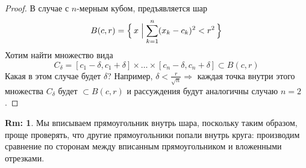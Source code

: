 \documentclass[12pt]{article}
\theoremstyle{definition}
\newtheorem{rem}{Rm:}
\begin{document}
\begin{proof}
	В случае с $n$-мерным кубом, предъявляется шар 
	$$
		B(c,r) = \Big\{\, x \Bigm\vert \sum\limits_{k = 1}^n (x_k - c_k)^2 < r^2 \,\Big\}
	$$ 
	Хотим найти множество вида 
	$$
		C_\delta = [c_1 - \delta, c_1 + \delta]\times \dotsc \times [c_n - \delta, c_n + \delta] \subset B(c,r)
	$$ 
	Какая в этом случае будет $\delta$? Например, $\delta < \tfrac{r}{\sqrt{n}} \Rightarrow$ каждая точка внутри этого множества $C_\delta$ будет $\subset B(c,r)$ и рассуждения будут аналогичны случаю $n=2$.
\end{proof}
\begin{rem}
	Мы вписываем прямоугольник внутрь шара, поскольку таким образом, проще проверять, что другие прямоугольники попали внутрь круга: производим сравнение по сторонам между вписанным прямоугольником и вложенными отрезками.
\end{rem}
\end{document}
